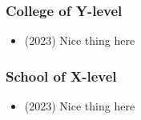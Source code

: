 \begin{adjustwidth}{2em}{0pt}
\subsubsection{College of Y-level}

\begin{itemize}
    \item (2023) Nice thing here 
\end{itemize}

\subsubsection{School of X-level}

\begin{itemize}
    \item (2023) Nice thing here 
\end{itemize}

\end{adjustwidth}


